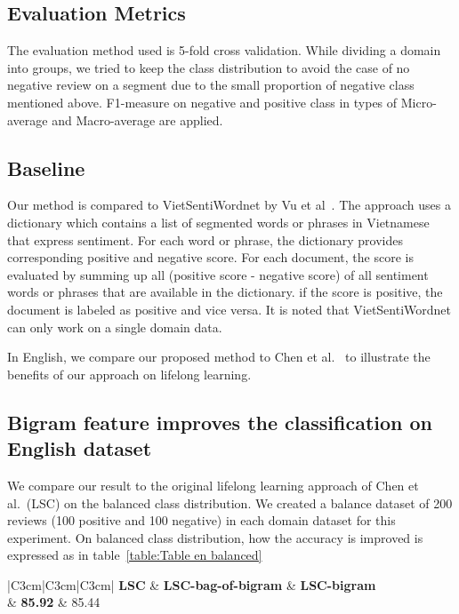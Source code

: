 \subsection{Evaluation Metrics}

The evaluation method used is 5-fold cross validation.
While dividing a domain into groups, we tried to keep the class distribution to avoid the case of no negative review on a segment due to the small proportion of negative class mentioned above.
F1-measure on negative and positive class in types of Micro-average and Macro-average are applied.

\subsection{Baseline}

Our method is compared to VietSentiWordnet by Vu et al~\cite{vu2014building}.
The approach uses a dictionary which contains a list of segmented words or phrases in Vietnamese that express sentiment.
For each word or phrase, the dictionary provides corresponding positive and negative score.
For each document, the score is evaluated by summing up all (positive score - negative score) of all sentiment words or phrases that are available in the dictionary.
if the score is positive, the document is labeled as positive and vice versa.
It is noted that VietSentiWordnet can only work on a single domain data.

In English, we compare our proposed method to Chen et al.~\cite{chen-ma-liu:2015:ACL-IJCNLP} to illustrate the benefits of our approach on lifelong learning.

\subsection{Bigram feature improves the classification on English dataset}
We compare our result to the original lifelong learning approach of Chen et al.~\cite{chen-ma-liu:2015:ACL-IJCNLP}(LSC) on the balanced class distribution.
We created a balance dataset of 200 reviews (100 positive and 100 negative) in each domain dataset for this experiment.
On balanced class distribution, how the accuracy is improved is expressed as in table~\ref{table:Table en balanced}
\begin{table}[htb]
\centering
\caption{Accuracies on English balanced distribution over 20 domains}
\begin{tabular}{|C{3cm}|C{3cm}|C{3cm}|}
	\hline
	\textbf{LSC}  & \textbf{LSC-bag-of-bigram} & \textbf{LSC-bigram}\\
	 & \textbf{85.92} & 85.44 \\
	\hline
\end{tabular}

\label{table:Table en balanced}
\end{table}

